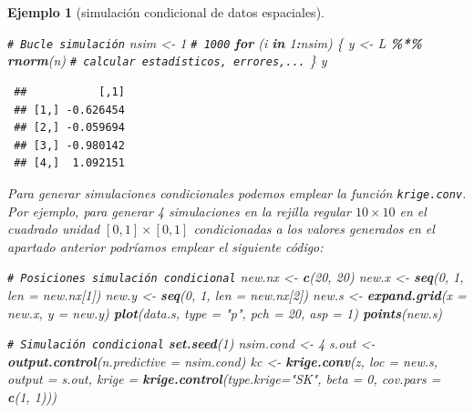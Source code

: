 \documentclass[
  spanish,
  10pt,
]{book}
\newenvironment{Shaded}{\begin{snugshade}}{\end{snugshade}}
\newcommand{\AttributeTok}[1]{\textcolor[rgb]{0.13,0.29,0.53}{#1}}
\newcommand{\CommentTok}[1]{\textcolor[rgb]{0.56,0.35,0.01}{\textit{#1}}}
\newcommand{\ControlFlowTok}[1]{\textcolor[rgb]{0.13,0.29,0.53}{\textbf{#1}}}
\newcommand{\DecValTok}[1]{\textcolor[rgb]{0.00,0.00,0.81}{#1}}
\newcommand{\FunctionTok}[1]{\textcolor[rgb]{0.13,0.29,0.53}{\textbf{#1}}}
\newcommand{\NormalTok}[1]{#1}
\newcommand{\OtherTok}[1]{\textcolor[rgb]{0.56,0.35,0.01}{#1}}
\newcommand{\SpecialCharTok}[1]{\textcolor[rgb]{0.81,0.36,0.00}{\textbf{#1}}}
\newcommand{\StringTok}[1]{\textcolor[rgb]{0.31,0.60,0.02}{#1}}
\theoremstyle{break}
\newtheorem{example}{Ejemplo}[chapter]
\theoremstyle{nonumberplain}
\renewcommand{\CommentTok}[1]{\textcolor[rgb]{0.41,0.41,0.41}{\texttt{#1}}}
\begin{document}
\begin{example}[simulación condicional de datos espaciales]
\begin{Shaded}
\begin{Highlighting}[]
\CommentTok{\# Bucle simulación}
\NormalTok{nsim }\OtherTok{\textless{}{-}} \DecValTok{1} \CommentTok{\# 1000}
\ControlFlowTok{for}\NormalTok{ (i }\ControlFlowTok{in} \DecValTok{1}\SpecialCharTok{:}\NormalTok{nsim) \{}
\NormalTok{  y }\OtherTok{\textless{}{-}}\NormalTok{ L }\SpecialCharTok{\%*\%} \FunctionTok{rnorm}\NormalTok{(n)}
  \CommentTok{\# calcular estadísticos, errores,...}
\NormalTok{\}}
\NormalTok{y}
\end{Highlighting}
\end{Shaded}

\begin{verbatim}
 ##           [,1]
 ## [1,] -0.626454
 ## [2,] -0.059694
 ## [3,] -0.980142
 ## [4,]  1.092151
\end{verbatim}

Para generar simulaciones condicionales podemos emplear la función \texttt{krige.conv}.
Por ejemplo, para generar 4 simulaciones en la rejilla regular \(10\times10\) en el cuadrado unidad \([0,1] \times [0,1]\) condicionadas a los valores generados en el apartado anterior podríamos emplear el siguiente código:

\begin{Shaded}
\begin{Highlighting}[]
\CommentTok{\# Posiciones simulación condicional}
\NormalTok{new.nx }\OtherTok{\textless{}{-}} \FunctionTok{c}\NormalTok{(}\DecValTok{20}\NormalTok{, }\DecValTok{20}\NormalTok{)}
\NormalTok{new.x }\OtherTok{\textless{}{-}} \FunctionTok{seq}\NormalTok{(}\DecValTok{0}\NormalTok{, }\DecValTok{1}\NormalTok{, }\AttributeTok{len =}\NormalTok{ new.nx[}\DecValTok{1}\NormalTok{])}
\NormalTok{new.y }\OtherTok{\textless{}{-}} \FunctionTok{seq}\NormalTok{(}\DecValTok{0}\NormalTok{, }\DecValTok{1}\NormalTok{, }\AttributeTok{len =}\NormalTok{ new.nx[}\DecValTok{2}\NormalTok{])}
\NormalTok{new.s }\OtherTok{\textless{}{-}} \FunctionTok{expand.grid}\NormalTok{(}\AttributeTok{x =}\NormalTok{ new.x, }\AttributeTok{y =}\NormalTok{ new.y)}
\FunctionTok{plot}\NormalTok{(data.s, }\AttributeTok{type =} \StringTok{"p"}\NormalTok{, }\AttributeTok{pch =} \DecValTok{20}\NormalTok{, }\AttributeTok{asp =} \DecValTok{1}\NormalTok{)}
\FunctionTok{points}\NormalTok{(new.s)}

\CommentTok{\# Simulación condicional}
\FunctionTok{set.seed}\NormalTok{(}\DecValTok{1}\NormalTok{)}
\NormalTok{nsim.cond }\OtherTok{\textless{}{-}} \DecValTok{4}
\NormalTok{s.out }\OtherTok{\textless{}{-}} \FunctionTok{output.control}\NormalTok{(}\AttributeTok{n.predictive =}\NormalTok{ nsim.cond)}
\NormalTok{kc }\OtherTok{\textless{}{-}} \FunctionTok{krige.conv}\NormalTok{(z, }\AttributeTok{loc =}\NormalTok{ new.s, }\AttributeTok{output =}\NormalTok{ s.out,}
            \AttributeTok{krige =} \FunctionTok{krige.control}\NormalTok{(}\AttributeTok{type.krige=}\StringTok{"SK"}\NormalTok{, }\AttributeTok{beta =} \DecValTok{0}\NormalTok{, }\AttributeTok{cov.pars =} \FunctionTok{c}\NormalTok{(}\DecValTok{1}\NormalTok{, }\DecValTok{1}\NormalTok{)))}
\end{Highlighting}
\end{Shaded}


\end{example}
\end{document}
